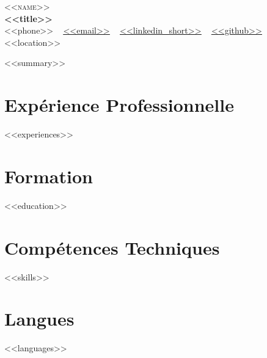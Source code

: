 \documentclass[letterpaper,11pt]{article}
\newcommand{\resumeSubHeadingListStart}{\begin{itemize}[leftmargin=0.0in,label={}]}
\newcommand{\resumeSubHeadingListEnd}{\end{itemize}}
\begin{document}
\begin{center}
{\Huge \scshape <<name>>} \\ \vspace{1pt}
\small \textbf{<<title>>} \\ \vspace{5pt}
\small
<<phone>> ~
\href{mailto:<<email>>}{\underline{<<email>>}} ~
\href{https://<<linkedin>>}{\underline{<<linkedin_short>>}} ~
\href{https://<<github>>}{\underline{<<github>>}} \\
\small <<location>>
\vspace{-8pt}
\end{center}

\begin{center}
\small <<summary>>
\end{center}

\vspace{-12pt}

\section{Exp\'erience Professionnelle}

\resumeSubHeadingListStart

<<experiences>>

\resumeSubHeadingListEnd

\section{Formation}

\resumeSubHeadingListStart

<<education>>

\resumeSubHeadingListEnd

\vspace{-16pt}

\section{Comp\'etences Techniques}

\begin{itemize}[leftmargin=0.15in,label={}]
\small{\item{
<<skills>>
}}
\end{itemize}

\vspace{-16pt}

\section{Langues}

\begin{itemize}[leftmargin=0.15in,label={}]
\small{\item{
<<languages>>
}}
\end{itemize}
\end{document}
